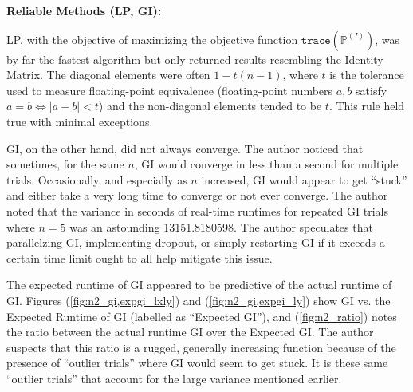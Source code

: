 \documentclass{article}
\begin{document}
\textbf{Reliable Methods (LP, GI):}

LP, with the objective of maximizing the objective function $\texttt{trace}(\mathbb{P}^{(I)})$, was by far the fastest algorithm but only returned results resembling the Identity Matrix. The diagonal elements were often $1-t(n-1)$, where $t$ is the tolerance used to measure floating-point equivalence (floating-point numbers $a,b$ satisfy $a=b \iff |a-b| < t$) and the non-diagonal elements tended to be $t$. This rule held true with minimal exceptions.

GI, on the other hand, did not always converge. The author noticed that sometimes, for the same $n$, GI would converge in less than a second for multiple trials. Occasionally, and especially as $n$ increased, GI would appear to get ``stuck'' and either take a very long time to converge or not ever converge. The author noted that the variance in seconds of real-time runtimes for repeated GI trials where $n=5$ was an astounding 13151.8180598. The author speculates that parallelzing GI, implementing dropout, or simply restarting GI if it exceeds a certain time limit ought to all help mitigate this issue.

The expected runtime of GI appeared to be predictive of the actual runtime of GI. Figures (\ref{fig:n2_gi,expgi_lxly}) and (\ref{fig:n2_gi,expgi_ly}) show GI vs. the Expected Runtime of GI (labelled as ``Expected GI''), and (\ref{fig:n2_ratio}) notes the ratio between the actual runtime GI over the Expected GI. The author suspects that this ratio is a rugged, generally increasing function because of the presence of ``outlier trials'' where GI would seem to get stuck. It is these same ``outlier trials'' that account for the large variance mentioned earlier.
\end{document}
